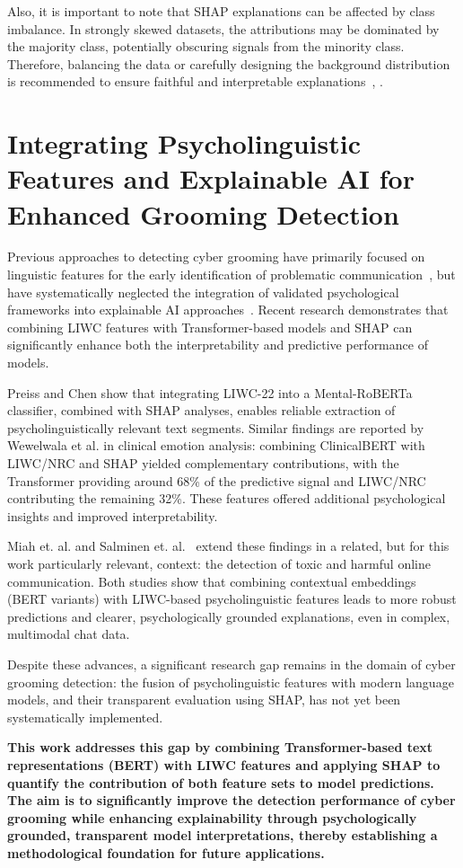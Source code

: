 Also, it is important to note that SHAP explanations can be affected by class imbalance. In strongly skewed datasets, the attributions may be dominated by the majority class, potentially obscuring signals from the minority class. Therefore, balancing the data or carefully designing the background distribution is recommended to ensure faithful and interpretable explanations~\cite{liu2022balancedbackgroundexplanationdata}, \cite{chen2024interpretable}.


\section{Integrating Psycholinguistic Features and Explainable AI for Enhanced Grooming Detection}
Previous approaches to detecting cyber grooming have primarily focused on linguistic features for the early identification of problematic communication~\cite{yakut-kilic-pan-2022-incorporating}, but have systematically neglected the integration of validated psychological frameworks into explainable AI approaches~\cite{broome2020psycholinguistic}. Recent research demonstrates that combining LIWC features with Transformer-based models and SHAP can significantly enhance both the interpretability and predictive performance of models.

Preiss and Chen \cite{preiss-chen-2024-incorporating} show that integrating LIWC-22 into a Mental-RoBERTa classifier, combined with SHAP analyses, enables reliable extraction of psycholinguistically relevant text segments. Similar findings are reported by Wewelwala et al. \cite{wewelwala2025hybrid} in clinical emotion analysis: combining ClinicalBERT with LIWC/NRC and SHAP yielded complementary contributions, with the Transformer providing around 68\% of the predictive signal and LIWC/NRC contributing the remaining 32\%. These features offered additional psychological insights and improved interpretability.

Miah et. al.\cite{miah-etal-2011-detection} and Salminen et. al.~\cite{salminen2025} extend these findings in a related, but for this work particularly relevant, context: the detection of toxic and harmful online communication. Both studies show that combining contextual embeddings (BERT variants) with LIWC-based psycholinguistic features leads to more robust predictions and clearer, psychologically grounded explanations, even in complex, multimodal chat data.

Despite these advances, a significant research gap remains in the domain of cyber grooming detection: the fusion of psycholinguistic features with modern language models, and their transparent evaluation using SHAP, has not yet been systematically implemented.

\textbf{This work addresses this gap by combining Transformer-based text representations (BERT) with LIWC features and applying SHAP to quantify the contribution of both feature sets to model predictions. The aim is to significantly improve the detection performance of cyber grooming while enhancing explainability through psychologically grounded, transparent model interpretations, thereby establishing a methodological foundation for future applications.}




